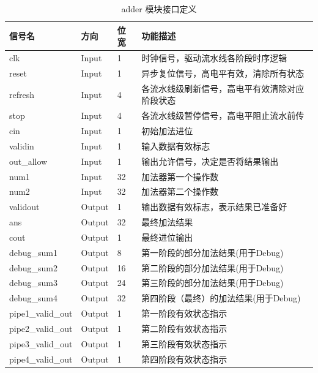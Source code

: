 \begin{table}[htp]
	\caption{adder 模块接口定义}\label{tab:adder_interface}
	\begin{center}
		\begin{tabular}{|l|l|l|p{6cm}|}
		\hline
		\textbf{信号名} & \textbf{方向} & \textbf{位宽} & \textbf{功能描述} \\ \hline \hline
		clk             & Input  & 1     & 时钟信号，驱动流水线各阶段时序逻辑 \\
		reset           & Input  & 1     & 异步复位信号，高电平有效，清除所有状态 \\
	refresh         & Input  & 4     & 各流水线级刷新信号，高电平有效清除对应阶段状态 \\
	stop            & Input  & 4     & 各流水线级暂停信号，高电平阻止流水前传 \\
	cin             & Input  & 1     & 初始加法进位 \\
	validin         & Input  & 1     & 输入数据有效标志 \\
	out\_allow      & Input  & 1     & 输出允许信号，决定是否将结果输出 \\
	num1            & Input  & 32    & 加法器第一个操作数 \\
	num2            & Input  & 32    & 加法器第二个操作数 \\
	validout        & Output & 1     & 输出数据有效标志，表示结果已准备好 \\
	ans             & Output & 32    & 最终加法结果 \\
	cout            & Output & 1     & 最终进位输出 \\
	debug\_sum1     & Output & 8     & 第一阶段的部分加法结果(用于Debug) \\
	debug\_sum2     & Output & 16    & 第二阶段的部分加法结果(用于Debug) \\
	debug\_sum3     & Output & 24    & 第三阶段的部分加法结果(用于Debug) \\
	debug\_sum4     & Output & 32    & 第四阶段（最终）的加法结果(用于Debug) \\
	pipe1\_valid\_out & Output & 1    & 第一阶段有效状态指示 \\
	pipe2\_valid\_out & Output & 1    & 第二阶段有效状态指示 \\
	pipe3\_valid\_out & Output & 1    & 第三阶段有效状态指示 \\
	pipe4\_valid\_out & Output & 1    & 第四阶段有效状态指示 \\
		\hline
		\end{tabular}
	\end{center}
	\end{table}
